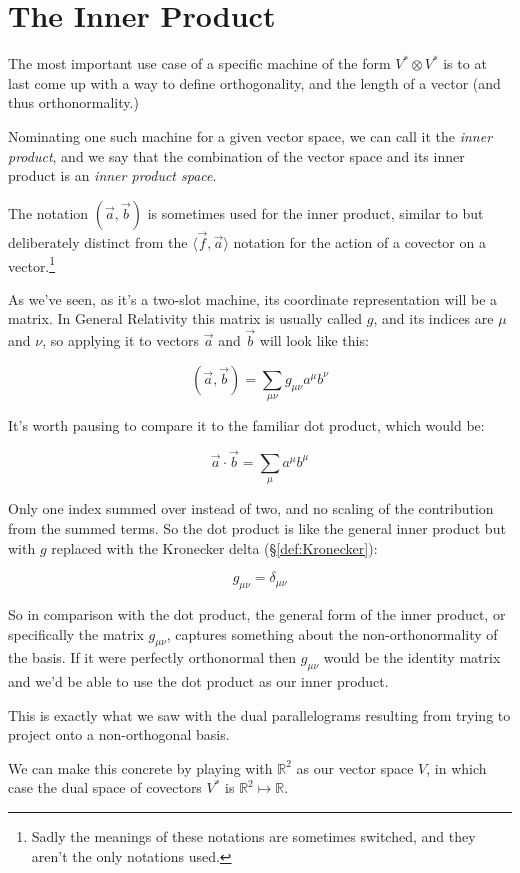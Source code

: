 \section{The Inner Product}

The most important use case of a specific machine of the form $V^* \otimes V^*$ is to at last come up with a way to define orthogonality, and the length of a vector (and thus orthonormality.)

Nominating one such machine for a given vector space, we can call it the \textit{inner product}, and we say that the combination of the vector space and its inner product is an \textit{inner product space}.

The notation $(\vec{a},\vec{b})$ is sometimes used for the inner product, similar to but deliberately distinct from the $\langle \vec{f},\vec{a}\rangle$ notation for the action of a covector on a vector.\footnote{Sadly the meanings of these notations are sometimes switched, and they aren't the only notations used.}

As we've seen, as it's a two-slot machine, its coordinate representation will be a matrix. In General Relativity this matrix is usually called $g$, and its indices are $\mu$ and $\nu$, so applying it to vectors $\vec{a}$ and $\vec{b}$ will look like this:

$$
(\vec{a},\vec{b}) = \sum_{\mu\nu} g_{\mu\nu} a^\mu b^\nu
$$

It's worth pausing to compare it to the familiar dot product, which would be:

$$
\vec{a} \cdot \vec{b} = \sum_{\mu} a^\mu b^\mu
$$

Only one index summed over instead of two, and no scaling of the contribution from the summed terms. So the dot product is like the general inner product but with $g$ replaced with the Kronecker delta (§\ref{def:Kronecker}):

$$
g_{\mu\nu} = \delta_{\mu\nu}
$$

So in comparison with the dot product, the general form of the inner product, or specifically the matrix $g_{\mu\nu}$, captures something about the non-orthonormality of the basis. If it were perfectly orthonormal then $g_{\mu\nu}$ would be the identity matrix and we'd be able to use the dot product as our inner product.

This is exactly what we saw with the dual parallelograms resulting from trying to project onto a non-orthogonal basis.

We can make this concrete by playing with $\mathbb{R}^2$ as our vector space $V$, in which case the dual space of covectors $V^*$ is $\mathbb{R}^2 \mapsto \mathbb{R}$.

